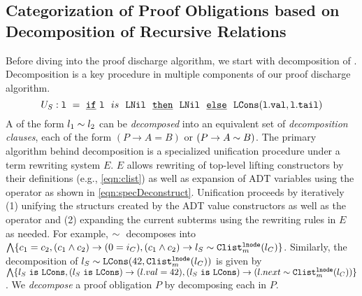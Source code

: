 \subsection[Categorization of Proof Obligations]{Categorization of Proof Obligations based on \\Decomposition of Recursive Relations}
\label{sec:syn-cat-decomp}
Before diving into the proof discharge algorithm, we start with decomposition of \recursiveRelations{}.
Decomposition is a key procedure in multiple components of our proof discharge algorithm.
\begin{equation}
\label{eqn:specDeconstruct}
U_S: {\tt l\ =\ \underline{if}\ l}\ \ is\ \ {\tt LNil\ \ \underline{then}\ \ LNil\ \ \underline{else}\ \ LCons(l.val,l.tail)}
\end{equation}
A \recursiveRelation{} of the form $l_1 \sim{} l_2$ can be {\em decomposed} into an
equivalent set of {\em decomposition clauses}, each of the form {\small $(P \rightarrow A = B)$ or $(P \rightarrow A \sim{} B)$}.
The primary algorithm behind decomposition is a specialized unification procedure under a term rewriting
system $E$. $E$ allows rewriting of top-level lifting constructors by their definitions (e.g., \cref{eqn:clist})
as well as expansion of ADT variables using the \sumDtor{} operator as shown in \cref{eqn:specDeconstruct}.
Unification proceeds by iteratively (1) unifying the structurs created by the ADT value constructors as well as the \sumDtor{}
operator and (2) expanding the current subterms using the rewriting rules in $E$ as needed.
For example, $\sim{}$
decomposes into $\bigwedge\{c_1=c_2, (c_1 \land c_2) \rightarrow (0=i_C), (c_1 \land c_2) \rightarrow l_S \sim{} {\tt Clist}_m^{\tt lnode}(l_C)\}$.
Similarly, the decomposition of $l_S\sim{}{\tt LCons}(42,{\tt Clist}_m^{\tt lnode}(l_C))$ is given by
$\bigwedge \{l_S\ {\tt is}\ {\tt LCons}, (l_S\ {\tt is}\ {\tt LCons}) \rightarrow (l.val=42), (l_S\ {\tt is}\ {\tt LCons}) \rightarrow (l.next \sim{} {\tt Clist}_m^{\tt lnode}(l_C))\}$.
We {\em decompose} a proof obligation $P$ by decomposing each \recursiveRelation{} in $P$.

